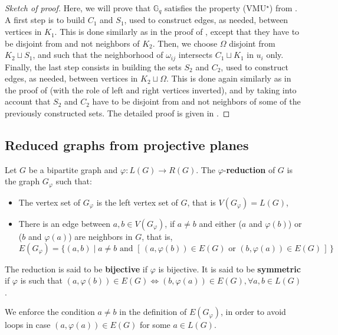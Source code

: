 \documentclass[a4paper,UKenglish,cleveref, autoref, thm-restate]{arxiv}
\newcommand{\G}[1][q]{\mathbb{G}_{#1}}
\begin{document}
\begin{proof}[Sketch of proof] Here, we will prove that $\G$ satisfies the property (VMU$^{\star}$) from .
    A first step is to build $C_1$ and $S_1$, used to construct edges, as needed, between vertices in $K_1$. This  is done similarly as in the proof of , except that they have to be disjoint from and not neighbors of $K_2$. Then, we choose $\Omega$ disjoint from $K_2 \sqcup S_1$, and such that the neighborhood of $\omega_{ij}$ intersects $C_1 \sqcup K_1$ in $u_i$ only. Finally, the last step consists in building the sets $S_2$ and $C_2$, used to construct edges, as needed, between vertices in $K_2 \sqcup \Omega$. This is done again similarly as in the proof of  (with the role of left and right vertices inverted), and by taking into account that $S_2$ and $C_2$ have to be disjoint from and not neighbors of some of the previously constructed sets. The detailed proof is given in . 
\end{proof}

\subsection{Reduced graphs from projective planes}
\label{subsec:reduced-graph}
\begin{definition}
    Let $G$ be a bipartite graph and $\varphi: L(G) \rightarrow R(G)$. The $\varphi$-\textbf{reduction} of $G$ is the graph $G_\varphi$ such that:
    \begin{itemize}
        \item The vertex set of $G_\varphi$ is the left vertex set of $G$, that is $V(G_\varphi) = L(G)$,
        \item There is an edge between $a,b\in V(G_\varphi)$, if $a\neq b$ and either ($a$ and $\varphi(b)$) or ($b$ and $\varphi(a)$) are neighbors in $G$, that is,
              $$E(G_\varphi) = \{ (a,b) \mid a \neq b \text{ and } [\,(a,\varphi(b)) \in E(G) \text{ or } (b,\varphi(a)) \in E(G)\,]\, \} $$
    \end{itemize}
    The reduction is said to be \textbf{bijective} if $\varphi$ is bijective. It is said to be \textbf{symmetric} if $\varphi$ is such that $(a,\varphi(b)) \in E(G) \Leftrightarrow (b,\varphi(a)) \in E(G),  \forall a,b \in L(G)$.   
\end{definition}
We enforce the condition $a\neq b$ in the definition of $E(G_\varphi)$, in order to avoid loops in case $(a,\varphi(a)) \in E(G)$ for some $a\in L(G)$.
\end{document}
